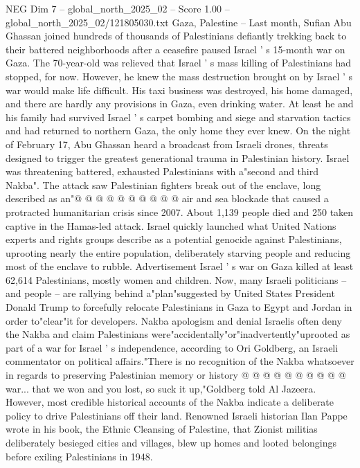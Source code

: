 \begin{textsample}{NEG Dim 7 – global\_north\_2025\_02 – Score 1.00 – global\_north\_2025\_02/121805030.txt}  \label{ex:f7_neg_179}
Gaza, Palestine -- Last month, Sufian Abu Ghassan joined hundreds of thousands of Palestinians defiantly trekking back to their battered neighborhoods after a ceasefire paused Israel ' s 15-month war on Gaza.
The 70-year-old was relieved that Israel ' s mass killing of Palestinians had stopped, for now.
However, he knew the mass destruction brought on by Israel ' s war would make life difficult.
His taxi business was destroyed, his home damaged, and there are hardly any provisions in Gaza, even drinking water.
At least he and his family had survived Israel ' s carpet bombing and siege and starvation tactics and had returned to northern Gaza, the only home they ever knew.
On the night of February 17, Abu Ghassan heard a broadcast from Israeli drones, threats designed to trigger the greatest generational trauma in Palestinian history.
Israel was threatening battered, exhausted Palestinians with a"second and third Nakba".
The attack saw Palestinian fighters break out of the enclave, long described as an"@ @ @ @ @ @ @ @ @ @ air and sea blockade that caused a protracted humanitarian crisis since 2007.
About 1,139 people died and 250 taken captive in the Hamas-led attack.
Israel quickly launched what United Nations experts and rights groups describe as a potential genocide against Palestinians, uprooting nearly the entire population, deliberately starving people and reducing most of the enclave to rubble.
Advertisement Israel ' s war on Gaza killed at least 62,614 Palestinians, mostly women and children.
Now, many Israeli politicians -- and people -- are rallying behind a"plan"suggested by United States President Donald Trump to forcefully relocate Palestinians in Gaza to Egypt and Jordan in order to"clear"it for developers.
Nakba apologism and denial Israelis often deny the Nakba and claim Palestinians were"accidentally"or"inadvertently"uprooted as part of a war for Israel ' s independence, according to Ori Goldberg, an Israeli commentator on political affairs."There is no recognition of the Nakba whatsoever in regards to preserving Palestinian memory or history @ @ @ @ @ @ @ @ @ @ war... that we won and you lost, so suck it up,"Goldberg told Al Jazeera.
However, most credible historical accounts of the Nakba indicate a deliberate policy to drive Palestinians off their land.
Renowned Israeli historian Ilan Pappe wrote in his book, the Ethnic Cleansing of Palestine, that Zionist militias deliberately besieged cities and villages, blew up homes and looted belongings before exiling Palestinians in 1948.

\end{textsample}
